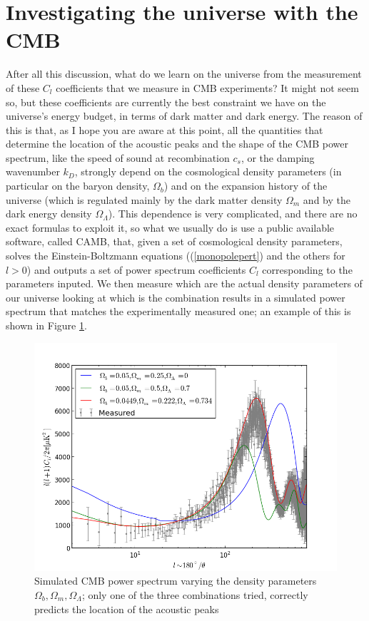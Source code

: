 \section{Investigating the universe with the CMB}
After all this discussion, what do we learn on the universe from the measurement of these $C_l$ coefficients that we measure in CMB experiments? It might not seem so, but these coefficients are currently the best constraint we have on the universe's energy budget, in terms of dark matter and dark energy. The reason of this is that, as I hope you are aware at this point, all the quantities that determine the location of the acoustic peaks and the shape of the CMB power spectrum, like the speed of sound at recombination $c_s$, or the damping wavenumber $k_D$, strongly depend on the cosmological density parameters (in particular on the baryon density, $\Omega_b$) and on the expansion history of the universe (which is regulated mainly by the dark matter density $\Omega_m$ and by the dark energy density $\Omega_\Lambda$). This dependence is very complicated, and there are no exact formulas to exploit it, so what we usually do is use a public available software, called CAMB, that, given a set of cosmological 
density parameters, solves the Einstein-Boltzmann equations ((\ref{monopolepert}) and the others for $l>0$) and outputs a set of power spectrum coefficients $C_l$ corresponding to the parameters inputed. We then measure which are the actual density parameters of our universe looking at which is the combination results in a simulated power spectrum that matches the experimentally measured one; an example of this is shown in Figure \ref{simpow}.    
\begin{figure}
\begin{center}
\includegraphics[scale=0.7]{CMB/simulated.png}
\end{center}
\caption{Simulated CMB power spectrum varying the density parameters $\Omega_b,\Omega_m,\Omega_\Lambda$; only one of the three combinations tried, correctly predicts the location of the acoustic peaks}
\label{simpow}
\end{figure}
